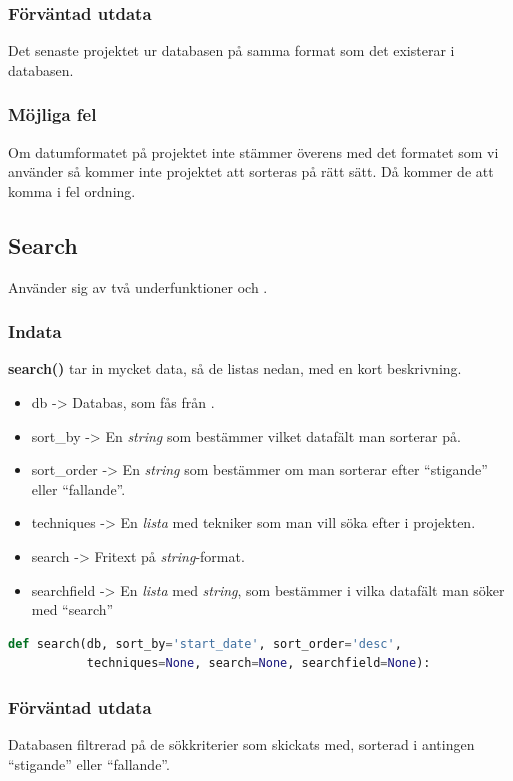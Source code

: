 \documentclass{TDP003mall}
\begin{document}
\subsubsection{Förväntad utdata}
Det senaste projektet ur databasen på samma format som det existerar i databasen.
\subsubsection{Möjliga fel}
Om datumformatet på projektet inte stämmer överens med det formatet som vi använder så kommer inte
projektet att sorteras på rätt sätt. Då kommer de att komma i fel ordning.

\subsection{Search}
\label{sec:search}
Använder sig av två underfunktioner \uline{} och \uline{}.
\subsubsection{Indata}
\textbf{search()} tar in mycket data, så de listas nedan, med en kort beskrivning.
\begin{itemize}
    \item db -> Databas, som fås från \uline{}.
    \item sort\_by -> En \textit{string} som bestämmer vilket datafält man sorterar på.
    \item sort\_order -> En \textit{string} som bestämmer om man sorterar efter \enquote{stigande} eller \enquote{fallande}.
    \item techniques -> En \textit{lista} med tekniker som man vill söka efter i projekten.
    \item search -> Fritext på \textit{string}-format.
    \item searchfield -> En \textit{lista} med \textit{string}, som bestämmer i vilka datafält man söker med \enquote{search}
\end{itemize}
\begin{lstlisting}[caption={Definering av \textbf{search()} funktionen.}, language=Python]
def search(db, sort_by='start_date', sort_order='desc',
           techniques=None, search=None, searchfield=None):
\end{lstlisting}
\subsubsection{Förväntad utdata}
Databasen filtrerad på de sökkriterier som skickats med, sorterad i antingen \enquote{stigande} eller \enquote{fallande}.
\end{document}
